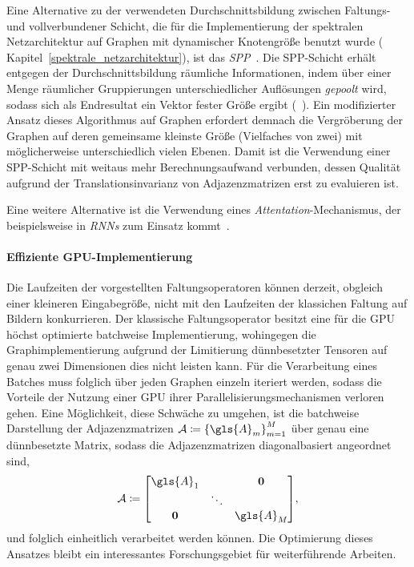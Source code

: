 Eine Alternative zu der verwendeten Durchschnittsbildung zwischen Faltungs- und vollverbundener Schicht, die für die Implementierung der spektralen Netzarchitektur auf Graphen mit dynamischer Knotengröße benutzt wurde (\vgl{} Kapitel~\ref{spektrale_netzarchitektur}), ist das \emph{\gls{SPP}}~\cite{spp}.
Die \gls{SPP}-Schicht erhält entgegen der Durchschnittsbildung räumliche Informationen, indem über einer Menge räumlicher Gruppierungen unterschiedlicher Auflösungen \emph{gepoolt} wird, sodass sich als Endresultat ein Vektor fester Größe ergibt (\vgl{}~\cite{spp}).
Ein modifizierter Ansatz dieses Algorithmus auf Graphen erfordert demnach die Vergröberung der Graphen auf deren gemeinsame kleinste Größe (Vielfaches von zwei) mit möglicherweise unterschiedlich vielen Ebenen.
Damit ist die Verwendung einer \gls{SPP}-Schicht mit weitaus mehr Berechnungsaufwand verbunden, dessen Qualität aufgrund der Translationsinvarianz von Adjazenzmatrizen erst zu evaluieren ist.

Eine weitere Alternative ist die Verwendung eines \emph{Attentation}-Mechanismus, der beispielsweise in \emph{\glspl{RNN}} zum Einsatz kommt~\cite{attentation}.

\paragraph{Effiziente GPU-Implementierung}
\label{gpu_implementierung}

Die Laufzeiten der vorgestellten Faltungsoperatoren können derzeit, obgleich einer kleineren Eingabegröße, nicht mit den Laufzeiten der klassichen Faltung auf Bildern konkurrieren.
Der klassische Faltungsoperator besitzt eine für die GPU höchst optimierte batchweise Implementierung, wohingegen die Graphimplementierung aufgrund der Limitierung dünnbesetzter Tensoren auf genau zwei Dimensionen dies nicht leisten kann.
Für die Verarbeitung eines Batches muss folglich über jeden Graphen einzeln iteriert werden, sodass die Vorteile der Nutzung einer GPU \bzgl{} ihrer Parallelisierungsmechanismen verloren gehen.
Eine Möglichkeit, diese Schwäche zu umgehen, ist die batchweise Darstellung der Adjazenzmatrizen $\mathcal{A} \coloneqq {\left\{\gls{A}_m\right\}}_{m=1}^M$ über genau eine dünnbesetzte Matrix, sodass die Adjazenzmatrizen diagonalbasiert angeordnet sind, \dhe{}
\begin{equation*}
  \mathcal{A} \coloneqq \begin{bmatrix}
  \gls{A}_1 & & \ma{0}\\
  & \ddots & \\
  \ma{0} & & \gls{A}_M
  \end{bmatrix},
\end{equation*}
und folglich einheitlich verarbeitet werden können.
Die Optimierung dieses Ansatzes bleibt ein interessantes Forschungsgebiet für weiterführende Arbeiten.
